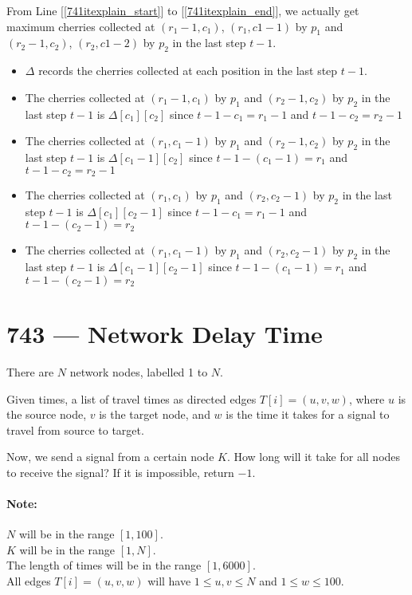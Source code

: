 \documentclass[a4paper,12pt]{article}
\begin{document}
From Line [\ref{741itexplain_start}] to [\ref{741itexplain_end}], we actually get maximum cherries collected at $(r_1-1,c_1)$, $(r_1,c1-1)$ by $p_1$ and $(r_2-1,c_2)$, $(r_2,c1-2)$ by $p_2$ in the last step $t-1$.
\begin{itemize}
    \item $\Delta$ records the cherries collected at each position in the last step $t-1$.
    \item The cherries collected at $(r_1-1, c_1)$ by $p_1$ and $(r_2-1, c_2)$ by $p_2$ in the last step $t- 1$ is $\Delta[c_1][c_2]$ since $t-1-c_1 = r_1-1$ and $t-1-c_2 = r_2-1$
    \item The cherries collected at $(r_1, c_1-1)$ by $p_1$ and $(r_2-1, c_2)$ by $p_2$ in the last step $t- 1$ is $\Delta[c_1-1][c_2]$ since $t-1-(c_1-1) = r_1$ and $t-1-c_2 = r_2-1$
    \item The cherries collected at $(r_1, c_1)$ by $p_1$ and $(r_2, c_2-1)$ by $p_2$ in the last step $t- 1$ is $\Delta[c_1][c_2-1]$ since $t-1-c_1 = r_1-1$ and $t-1-(c_2-1) = r_2$
    \item The cherries collected at $(r_1, c_1-1)$ by $p_1$ and $(r_2, c_2-1)$ by $p_2$ in the last step $t- 1$ is $\Delta[c_1-1][c_2-1]$ since $t-1-(c_1-1) = r_1$ and $t-1-(c_2-1) = r_2$
\end{itemize}

\section{743 --- Network Delay Time}
There are $N$ network nodes, labelled 1 to $N$.
\par
Given times, a list of travel times as directed edges $T[i] = (u, v, w)$, where $u$ is the source node, $v$ is the target node, and $w$ is the time it takes for a signal to travel from source to target.
\par
Now, we send a signal from a certain node $K$. How long will it take for all nodes to receive the signal? If it is impossible, return $-1$.
\paragraph{Note:}
\begin{flushleft}
$N$ will be in the range $[1, 100]$.
\\
$K$ will be in the range $[1, N]$.
\\
The length of times will be in the range $[1, 6000]$.
\\
All edges $T[i] = (u, v, w)$ will have $1 \leq u, v \leq N$ and $1 \leq w \leq 100$.
\end{flushleft}
\end{document}
